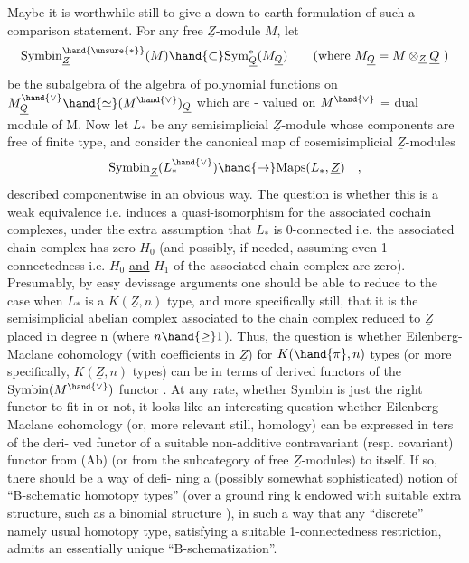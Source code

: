 
Maybe it is worthwhile still to give a down-to-earth formulation of
such a comparison statement. For any free $\underline{Z}$-module $M$, let
\[ \mathrm{Symbin}^{\hand{\unsure{*}}}_{\underline{Z}}(M) \hand{\subset} \mathrm{Sym}^{*}_{\underline{Q}}(M_{\underline{Q}}) \qquad \text{(where } M_{\underline{Q}} = M\otimes_{\underline{Z}}\underline{Q} \text{ )} \]
be the subalgebra of the algebra of polynomial functions on $M_{\underline{Q}}^{\hand{\vee}}\hand{\simeq}(M^{\hand{\vee}})_{\underline{Q}}$
which are  - valued on $M^{\hand{\vee}}$ = dual module of M. Now let $L_{*}$
be any semisimplicial $\underline{Z}$-module whose components are free of finite type,
and consider the canonical map of cosemisimplicial $\underline{Z}$-modules
\[ \mathrm{Symbin}_{\underline{Z}}(L_{*}^{\hand{\vee}}) \hand{\to} \mathrm{Maps}(L_{*}, \underline{Z}) \quad , \]
described componentwise in an obvious way. The question is whether this
is a weak equivalence i.e. induces a  quasi-isomorphism for
the associated cochain complexes, under the extra assumption that $L_{*}$ is
0-connected i.e. the associated chain complex has zero $H_{0}$ (and possibly,
if needed, assuming even 1-connectedness i.e. $H_{0}$ \uline{and} $H_{1}$ of the associated
chain complex are  zero). Presumably, by easy devissage arguments one
should be able to reduce to the case when $L_{*}$ is a $K(\underline{Z},n)$ type,  and
more specifically still, that it is the semisimplicial abelian complex
associated to the chain complex reduced to $\underline{Z}$ placed in degree n (where
$n\hand{\geq}1$). Thus, the question is whether Eilenberg-Maclane cohomology (with
coefficients in $\underline{Z}$) for $K(\hand{\pi},n)$ types (or more specifically, $K(\underline{Z},n)$ types)
can be  in terms of derived functors of the $\mathrm{Symbin}(M^{\hand{\vee}})$ functor .
At any rate, whether Symbin is just the right functor to fit in or not,
it looks like an interesting question whether Eilenberg-Maclane cohomology
(or, more relevant still, homology) can be expressed in ters of the deri-%
ved functor of a suitable non-additive contravariant (resp. covariant)
functor from (Ab) (or from the subcategory of free $\underline{Z}$-modules) to itself.
If so, there should be a  way of defi-%
ning a (possibly somewhat sophisticated) notion of ``B-schematic homotopy
types'' (over a ground ring k endowed with suitable extra structure, such
as a binomial structure ),  in such a way that any  ``discrete'' namely
usual homotopy type, satisfying a suitable 1-connectedness restriction,
admits an essentially unique ``B-schematization''.

